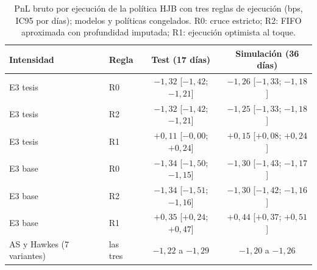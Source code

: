 \begin{table}[htbp]
\centering\small
\caption[Sensibilidad del PnL a la regla de ejecución.]{PnL bruto por ejecución de la política HJB con tres reglas de ejecución (bps, IC95 por días); modelos y políticas congelados. R0: cruce estricto; R2: FIFO aproximada con profundidad imputada; R1: ejecución optimista al toque.}
\label{tab:cola}
\begin{tabular}{@{}llcc@{}}\toprule
Intensidad & Regla & Test (17 días) & Simulación (36 días)\\\midrule
E3 tesis & R0 & $-1{,}32$ [$-1{,}42$; $-1{,}21$] & $-1{,}26$ [$-1{,}33$; $-1{,}18$]\\
E3 tesis & R2 & $-1{,}32$ [$-1{,}42$; $-1{,}21$] & $-1{,}25$ [$-1{,}33$; $-1{,}18$]\\
E3 tesis & R1 & $+0{,}11$ [$-0{,}00$; $+0{,}24$] & $+0{,}15$ [$+0{,}08$; $+0{,}24$]\\
E3 base & R0 & $-1{,}34$ [$-1{,}50$; $-1{,}15$] & $-1{,}30$ [$-1{,}43$; $-1{,}17$]\\
E3 base & R2 & $-1{,}34$ [$-1{,}51$; $-1{,}16$] & $-1{,}30$ [$-1{,}42$; $-1{,}16$]\\
E3 base & R1 & $+0{,}35$ [$+0{,}24$; $+0{,}47$] & $+0{,}44$ [$+0{,}37$; $+0{,}51$]\\
AS y Hawkes (7 variantes) & las tres & $-1{,}22$ a $-1{,}29$ & $-1{,}20$ a $-1{,}26$\\\bottomrule
\end{tabular}
\end{table}

